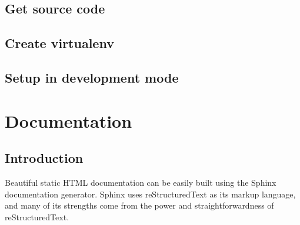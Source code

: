 \documentclass[letterpaper,10pt,english]{sphinxmanual}
\begin{document}
\subsection{Get source code}
\label{\detokenize{contributing:get-source-code}}
\begin{sphinxVerbatim}[commandchars=\\\{\}]
  
 
  
\end{sphinxVerbatim}


\subsection{Create virtualenv}
\label{\detokenize{contributing:create-virtualenv}}
\begin{sphinxVerbatim}[commandchars=\\\{\}]
  
 
\end{sphinxVerbatim}


\subsection{Setup in development mode}
\label{\detokenize{contributing:setup-in-development-mode}}
\begin{sphinxVerbatim}[commandchars=\\\{\}]
  
\end{sphinxVerbatim}


\section{Documentation}
\label{\detokenize{documentation:documentation}}\label{\detokenize{documentation::doc}}

\subsection{Introduction}
\label{\detokenize{documentation:introduction}}
Beautiful static HTML documentation can be easily built using the Sphinx documentation generator.
Sphinx uses reStructuredText as its markup language, and many of its strengths come from the power
and straightforwardness of reStructuredText.
\end{document}
